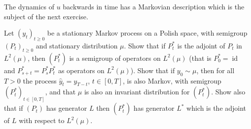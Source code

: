 \documentclass[a4paper,11pt]{article}
\newcommand{\tmop}[1]{\ensuremath{\operatorname{#1}}}
\begin{document}
\medskip
The dynamics of $u$ backwards in time has a Markovian description which is the
subject of the next exercise.

\begin{exercise}
  Let $(y_t)_{t \geqslant 0}$ be a stationary Markov process on a Polish
  space, with semigroup $(P_t)_{t \geqslant 0}$ and stationary distribution
  ${\mu}$. Show that if $P^{\ast}_t$ is the adjoint of $P_t$ in $L^2
  ({\mu})$, then $(P^{\ast}_t)$ is a semigroup of operators on $L^2
  ({\mu})$ (that is $P^{\ast}_0 = \tmop{id}$ and $P^{\ast}_{s + t} =
  P^{\ast}_s P^{\ast}_t$ as operators on $L^2 ({\mu})$). Show that if $y_0
  \sim {\mu}$, then for all $T > 0$ the process $\hat{y}_t = y_{T - t}$,
  $t \in [0, T]$, is also Markov, with semigroup $(P^{\ast}_t)_{t \in [0,
  T]}$, and that ${\mu}$ is also an invariant distribution for
  $(P^{\ast}_t)$. Show also that if $(P_t)$ has generator $L$ then
  $(P^{\ast}_t)$ has generator $L^{\ast}$ which is the adjoint of $L$ with
  respect to $L^2 ({\mu})$.
\end{exercise}
\end{document}
